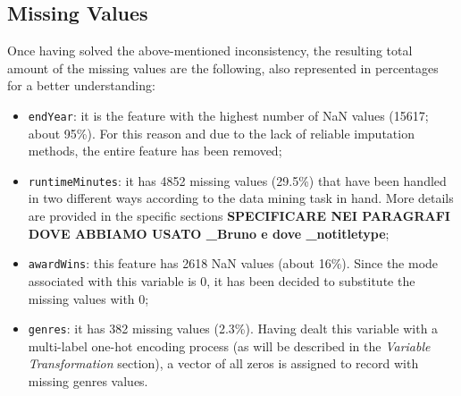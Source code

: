 \subsection{Missing Values}
Once having solved the above-mentioned inconsistency, the resulting total amount of the missing values are the following, 
also represented in percentages for a better understanding:
\begin{itemize}
    \item \texttt{endYear}: it is the feature with the highest number of NaN values (15617; about 95\%). For this reason and due to the lack of reliable imputation methods, the entire feature has been removed;
    
    \item \texttt{runtimeMinutes}: it has 4852 missing values (29.5\%) that have been handled in two different ways according to the data mining task in hand. More details are provided in the specific sections \textbf{SPECIFICARE NEI PARAGRAFI DOVE ABBIAMO USATO \_Bruno e dove \_notitletype};
    
    \item \texttt{awardWins}: this feature has 2618 NaN values (about 16\%). Since the mode associated with this variable is 0, it has been decided to substitute the missing values with 0;

    \item \texttt{genres}: it has 382 missing values (2.3\%). Having dealt this variable with a multi-label one-hot encoding process (as will be described in the \textit{Variable Transformation} section), a vector of all zeros is assigned to record with missing genres values.
\end{itemize}



